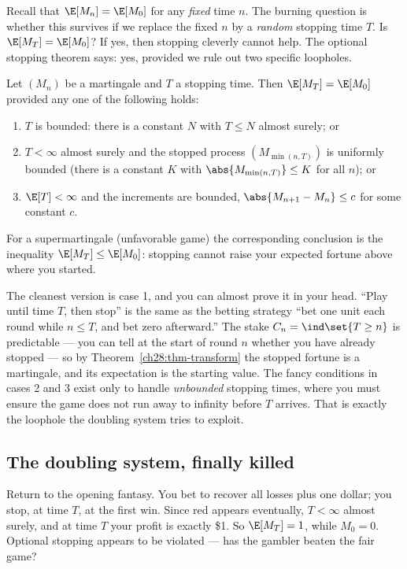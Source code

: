Recall that $\E[M_n] = \E[M_0]$ for any \emph{fixed} time $n$. The burning question is whether this
survives if we replace the fixed $n$ by a \emph{random} stopping time $T$. Is $\E[M_T] = \E[M_0]$?
If yes, then stopping cleverly cannot help. The optional stopping theorem says: yes, provided we rule
out two specific loopholes.

\begin{theorem}
\label{ch28:thm-ost}
Let $(M_n)$ be a martingale and $T$ a stopping time. Then $\E[M_T] = \E[M_0]$ provided any one of the
following holds:
\begin{enumerate}
\item $T$ is bounded: there is a constant $N$ with $T \le N$ almost surely; or
\item $T < \infty$ almost surely and the stopped process $(M_{\min(n,T)})$ is uniformly bounded
      (there is a constant $K$ with $\abs{M_{\min(n,T)}} \le K$ for all $n$); or
\item $\E[T] < \infty$ and the increments are bounded, $\abs{M_{n+1} - M_n} \le c$ for some constant
      $c$.
\end{enumerate}
For a supermartingale (unfavorable game) the corresponding conclusion is the inequality
$\E[M_T] \le \E[M_0]$: stopping cannot raise your expected fortune above where you started.
\end{theorem}

\begin{intuitionbox}
The cleanest version is case 1, and you can almost prove it in your head. ``Play until time $T$, then
stop'' is the same as the betting strategy ``bet one unit each round while $n \le T$, and bet zero
afterward.'' The stake $C_n = \ind\set{T \ge n}$ is predictable --- you can tell at the start of round
$n$ whether you have already stopped --- so by Theorem~\ref{ch28:thm-transform} the stopped fortune is
a martingale, and its expectation is the starting value. The fancy conditions in cases 2 and 3 exist
only to handle \emph{unbounded} stopping times, where you must ensure the game does not run away to
infinity before $T$ arrives. That is exactly the loophole the doubling system tries to exploit.
\end{intuitionbox}

\subsection{The doubling system, finally killed}

Return to the opening fantasy. You bet to recover all losses plus one dollar; you stop, at time $T$, at
the first win. Since red appears eventually, $T < \infty$ almost surely, and at time $T$ your profit is
exactly \$1. So $\E[M_T] = 1$, while $M_0 = 0$. Optional stopping appears to be violated --- has the
gambler beaten the fair game?

